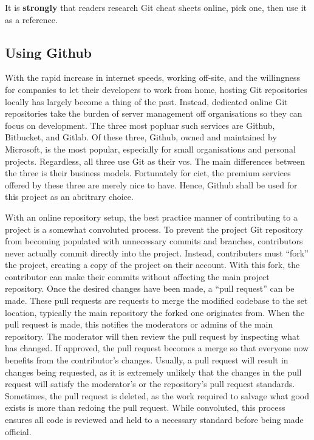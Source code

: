\documentclass[11pt]{article}
\begin{document}
\noindent
It is \textbf{strongly} that readers research Git cheat sheets online, pick one, then use it as a reference.

\subsection{Using Github}

With the rapid increase in internet speeds, working off-site, and the willingness for companies to let their developers to work from home, hosting Git repositories locally has largely become a thing of the past. Instead, dedicated online Git repositories take the burden of \gls{server} management off organisations so they can focus on development. The three most popluar such services are Github, Bitbucket, and Gitlab. Of these three, Github, owned and maintained by Microsoft, is the most popular, especially for small organisations and personal projects. Regardless, all three use Git as their \acrshort{vcs}. The main differences between the three is their business models. Fortunately for \acrshort{ciet}, the premium services offered by these three are merely nice to have. Hence, Github shall be used for this project as an abritrary choice.

With an online repository setup, the best practice manner of contributing to a project is a somewhat convoluted process. To prevent the project Git repository from becoming populated with unnecessary commits and branches, contributors never actually commit directly into the project. Instead, contributers must ``fork'' the project, creating a copy of the project on their account. With this fork, the contributor can make their commits without affecting the main project repository. Once the desired changes have been made, a ``pull \gls{request}'' can be made. These pull \gls{request}s are \gls{request}s to merge the modified codebase to the set location, typically the main repository the forked one originates from. When the pull \gls{request} is made, this notifies the moderators or admins of the main repository. The moderator will then review the pull \gls{request} by inspecting what has changed. If approved, the pull \gls{request} becomes a merge so that everyone now benefits from the contributor's changes. Usually, a pull \gls{request} will result in changes being \gls{request}ed, as it is extremely unlikely that the changes in the pull \gls{request} will satisfy the moderator's or the repository's pull \gls{request} standards. Sometimes, the pull \gls{request} is deleted, as the work required to salvage what good exists is more than redoing the pull \gls{request}. While convoluted, this process ensures all code is reviewed and held to a necessary standard before being made official.
\end{document}
